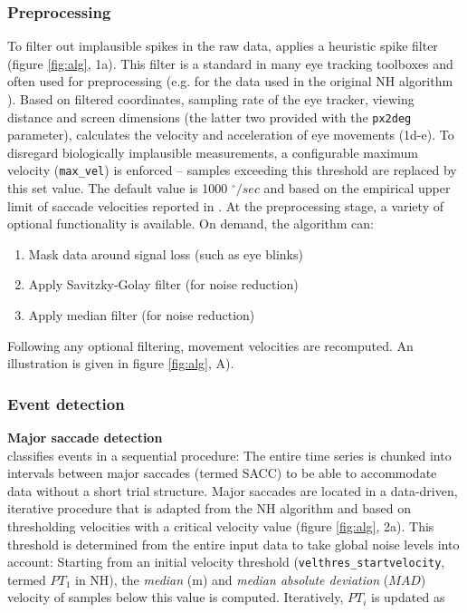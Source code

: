     \subsubsection*{Preprocessing}

    To filter out implausible spikes in the raw data, \remodnav applies a heuristic spike filter \citep{stampe1993}
    (figure \ref{fig:alg}, 1a). This filter is a standard in many eye tracking toolboxes and often used for preprocessing
    (e.g. for the data used in the original NH algorithm \citep{Friedman2018}). Based on filtered coordinates, sampling
    rate of the eye tracker, viewing distance and screen dimensions (the latter two provided with the \texttt{px2deg}
    parameter), \remodnav calculates the velocity and acceleration of eye movements (1d-e). To disregard biologically
    implausible measurements, a configurable maximum velocity (\texttt{max\_vel}) is enforced -- samples exceeding this
    threshold are replaced by this set value. The default value is 1000 $^\circ/sec$ and based on the empirical upper
    limit of saccade velocities reported in \cite{holmqvist2011eye}.
    At the preprocessing stage, a variety of optional functionality is available. On demand, the algorithm can:
    \begin{enumerate}
        \item Mask data around signal loss (such as eye blinks)
        \item Apply Savitzky-Golay filter (for noise reduction)
        \item Apply median filter (for noise reduction)
    \end{enumerate}
    Following any optional filtering, movement velocities are recomputed. An illustration is given in figure
    \ref{fig:alg}, A).\\

    \subsubsection*{Event detection}

    \textbf{Major saccade detection}\\
    \remodnav classifies events in a sequential procedure: The entire time series is chunked into intervals between
    major saccades (termed SACC) to be able to accommodate
    data without a short trial structure. Major saccades are located in a data-driven,
    iterative procedure that is adapted from the NH algorithm and based on thresholding velocities with a critical
    velocity value (figure \ref{fig:alg}, 2a). This threshold is determined from the entire input data to take global
    noise levels into account: Starting from an initial velocity threshold
    (\texttt{velthres\_\linebreak[0]startvelocity}, termed
    $PT_1$ in NH), the \textit{median} (m) and \textit{median absolute deviation} ($MAD$) velocity of samples below this
    value is computed. Iteratively, $PT_i$ is updated as

